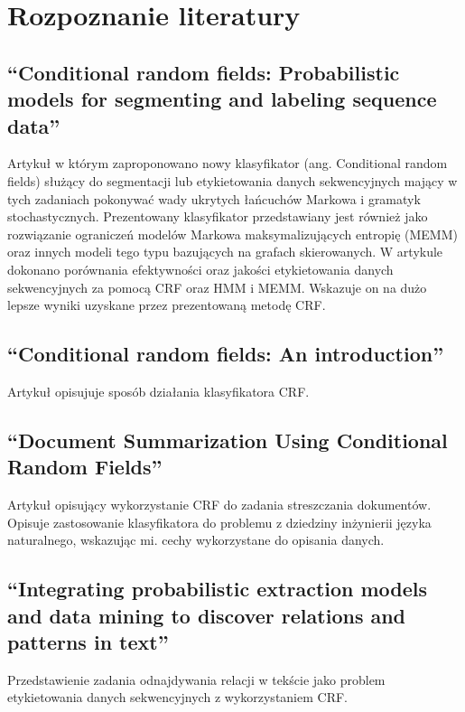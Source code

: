 \documentclass[a4paper,10pt]{report}
\begin{document}
\section{Rozpoznanie literatury}

\subsection{``Conditional random fields: Probabilistic models for segmenting and labeling sequence data'' \cite{lafferty2001crf}}

Artykuł w którym zaproponowano nowy klasyfikator (ang. Conditional random fields) służący do segmentacji lub etykietowania danych sekwencyjnych mający w tych zadaniach pokonywać wady ukrytych łańcuchów Markowa i gramatyk stochastycznych. Prezentowany klasyfikator przedstawiany jest również jako rozwiązanie ograniczeń modelów Markowa maksymalizujących entropię (MEMM) oraz innych modeli tego typu bazujących na grafach skierowanych. W artykule dokonano porównania efektywności oraz jakości etykietowania danych sekwencyjnych za pomocą CRF oraz HMM i MEMM. Wskazuje on na dużo lepsze wyniki uzyskane przez prezentowaną metodę CRF. 

\subsection{``Conditional random fields: An introduction'' \cite{wallach2004crf}}

Artykuł opisujuje sposób działania klasyfikatora CRF. 

\subsection{``Document Summarization Using Conditional Random Fields'' \cite{shen2007doccum}}

Artykuł opisujący wykorzystanie CRF do zadania streszczania dokumentów. Opisuje zastosowanie klasyfikatora do problemu z dziedziny inżynierii języka naturalnego, wskazując mi. cechy wykorzystane do opisania danych.  

\subsection{``Integrating probabilistic extraction models and data mining to discover relations and patterns in text'' \cite{culotta2006integrating}}

Przedstawienie zadania odnajdywania relacji w tekście jako problem etykietowania danych sekwencyjnych z wykorzystaniem CRF.
\end{document}
